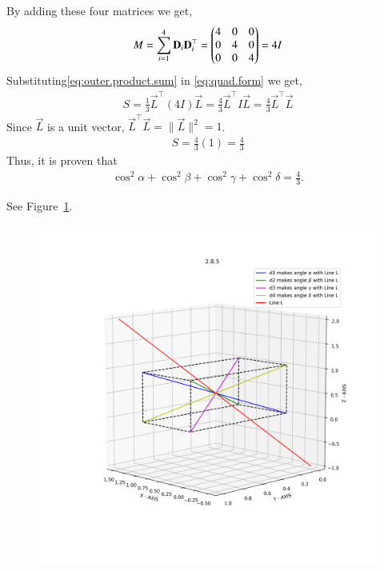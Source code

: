 \documentclass[journal]{IEEEtran}
\begin{document}
By adding these four matrices we get,
\begin{align}
    M = \sum_{i=1}^{4} \mathbf{D}_i \mathbf{D}_i^\top = \begin{pmatrix}4&0&0\\0&4&0\\0&0&4\end{pmatrix}= 4I
    \label{eq:outer.product.sum}
\end{align}
Substituting\eqref{eq:outer.product.sum} in \eqref{eq:quad.form} we get,
\begin{align}
    S = \frac{1}{3} \vec{L}^\top (4I) \vec{L} = \frac{4}{3} \vec{L}^\top I \vec{L} = \frac{4}{3} \vec{L}^\top \vec{L}
\end{align}
Since $\vec{L}$ is a unit vector, $\vec{L}^\top \vec{L} = \|\vec{L}\|^2 = 1$.
\begin{align}
    S = \frac{4}{3}(1) = \frac{4}{3}
\end{align}
Thus, it is proven that 
\begin{align*}
\cos^2\alpha + \cos^2\beta + \cos^2\gamma + \cos^2\delta = \frac{4}{3}.
\end{align*}

See Figure~\ref{fig:3DVectors}.

\begin{figure}[h!]
    \centering
    \includegraphics[width=1.0\linewidth]{figs/fig4.png}
    \caption{}
    \label{fig:3DVectors}
\end{figure}
\end{document}

